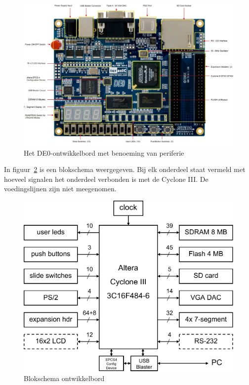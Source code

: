 \documentclass[a4paper,12pt,fleqn,twoside]{book}
\begin{document}
\begin{figure}[H]
\centering
\includegraphics[scale=0.92]{DE0_layout_yellow_1000.jpg}
\caption{Het DE0-ontwikkelbord met benoeming van periferie}
\label{fig:DE0-layout-yellow-1000}
\end{figure}

In figuur~\ref{fig:010blockdiagram} is een blokschema weergegeven. Bij elk
onderdeel staat vermeld met hoeveel signalen het onderdeel verbonden is met de
Cyclone III. De voedingslijnen zijn niet meegenomen. 

\begin{figure}[H]
\centering
\includegraphics[scale=0.50]{010blockdiagram.pdf}
\caption{Blokschema ontwikkelbord}
\label{fig:010blockdiagram}
\end{figure}
\end{document}
